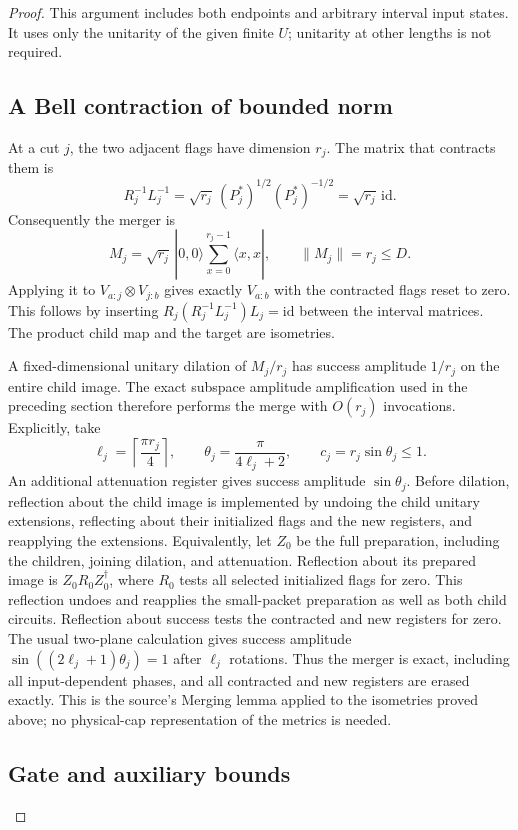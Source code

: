 \documentclass[11pt]{article}
\newcommand{\id}{\mathrm{id}}
\begin{document}
\begin{proof}
This argument includes both endpoints and arbitrary interval input
states. It uses only the unitarity of the given finite $U$;
unitarity at other lengths is not required.

\subsection*{A Bell contraction of bounded norm}

At a cut $j$, the two adjacent flags have dimension $r_j$.
The matrix that contracts them is
\[
 R_j^{-1}L_j^{-1}
 =\sqrt{r_j}\,(P_j^*)^{1/2}(P_j^*)^{-1/2}
 =\sqrt{r_j}\,\id.
\]
Consequently the merger is
\[
 M_j=\sqrt{r_j}\,|0,0\rangle
                 \sum_{x=0}^{r_j-1}\langle x,x|,
 \qquad \|M_j\|=r_j\leq D.
\]
Applying it to $V_{a:j}\otimes V_{j:b}$ gives exactly $V_{a:b}$
with the contracted flags reset to zero. This follows by inserting
$R_j(R_j^{-1}L_j^{-1})L_j=\id$ between the interval matrices.
The product child map and the target are isometries.

A fixed-dimensional unitary dilation of $M_j/r_j$ has success
amplitude $1/r_j$ on the entire child image. The exact subspace
amplitude amplification used in the preceding section therefore
performs the merge with $O(r_j)$ invocations. Explicitly, take
\[
 \ell_j=\left\lceil\frac{\pi r_j}{4}\right\rceil,
 \qquad\theta_j=\frac{\pi}{4\ell_j+2},
 \qquad c_j=r_j\sin\theta_j\leq1.
\]
An additional attenuation register gives success amplitude
$\sin\theta_j$. Before dilation, reflection about the child image
is implemented by undoing the child unitary extensions, reflecting
about their initialized flags and the new registers, and reapplying
the extensions. Equivalently, let $Z_0$ be the full preparation,
including the children, joining dilation, and attenuation. Reflection
about its prepared image is $Z_0R_0Z_0^\dagger$, where $R_0$ tests
all selected initialized flags for zero. This reflection undoes and
reapplies the small-packet preparation as well as both child circuits.
Reflection about success tests the contracted and new registers for zero. The usual two-plane calculation gives
success amplitude $\sin((2\ell_j+1)\theta_j)=1$ after $\ell_j$
rotations. Thus the merger is exact, including all input-dependent
phases, and all contracted and new registers are erased exactly.
This is the source's Merging lemma applied to the isometries proved
above; no physical-cap representation of the metrics is needed.

\subsection*{Gate and auxiliary bounds}


\end{proof}
\end{document}
